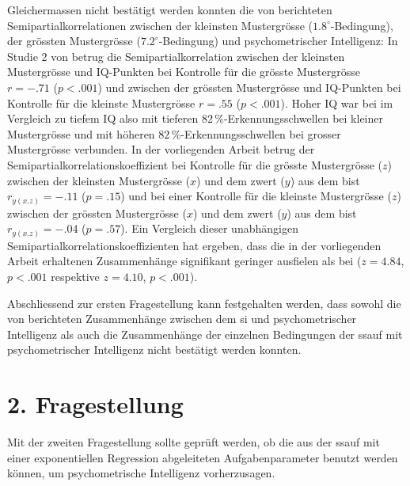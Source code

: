 \documentclass[11pt, twoside, a4paper]{book}		%
\begin{document}
Gleichermassen nicht bestätigt werden konnten die von \citet{Melnick2013} berichteten Semipartialkorrelationen zwischen der kleinsten Mustergrösse ($1.8^{\circ}$-Bedingung), der grössten Mustergrösse ($7.2^{\circ}$-Bedingung) und psychometrischer Intelligenz: In Studie 2 von \citeauthor{Melnick2013} betrug die Semipartialkorrelation zwischen der kleinsten Mustergrösse und IQ-Punkten bei Kontrolle für die grösste Mustergrösse $r=-.71$ ($p<.001$) und zwischen der grössten Mustergrösse und IQ-Punkten bei Kontrolle für die kleinste Mustergrösse $r=.55$ ($p<.001$). Hoher IQ war bei \citeauthor{Melnick2013} im Vergleich zu tiefem IQ also mit tieferen $82\,\%$-Erkennungsschwellen bei kleiner Mustergrösse und mit höheren $82\,\%$-Erkennungsschwellen bei grosser Mustergrösse verbunden. 
In der vorliegenden Arbeit betrug der Semipartialkorrelationskoeffizient bei Kontrolle für die grösste Mustergrösse ($z$) zwischen der kleinsten Mustergrösse ($x$) und dem \gls{zwert} ($y$) aus dem \gls{bist} $r_{y(x.z)}= -.11$ ($p = .15$) und bei einer Kontrolle für die kleinste Mustergrösse ($z$) zwischen der grössten Mustergrösse ($x$) und dem \gls{zwert} ($y$) aus dem \gls{bist} $r_{y(x.z)}=-.04$ ($p = .57$). 
Ein Vergleich dieser unabhängigen Semipartialkorrelationskoeffizienten hat ergeben, dass die in der vorliegenden Arbeit erhaltenen Zusammenhänge signifikant geringer ausfielen als bei \citeauthor{Melnick2013} ($z=4.84$, $p<.001$ respektive $z=4.10$, $p<.001$).

Abschliessend zur ersten Fragestellung kann festgehalten werden, dass sowohl die von \citet{Melnick2013} berichteten Zusammenhänge zwischen dem \gls{si} und psychometrischer Intelligenz als auch die Zusammenhänge der einzelnen Bedingungen der \gls{ssauf} mit psychometrischer Intelligenz nicht bestätigt werden konnten.













\section{2. Fragestellung \label{sec:2Fragestellung}}

Mit der zweiten Fragestellung sollte geprüft werden, ob die aus der \gls{ssauf} mit einer exponentiellen Regression abgeleiteten Aufgabenparameter benutzt werden können, um psychometrische Intelligenz vorherzusagen.
\end{document}
